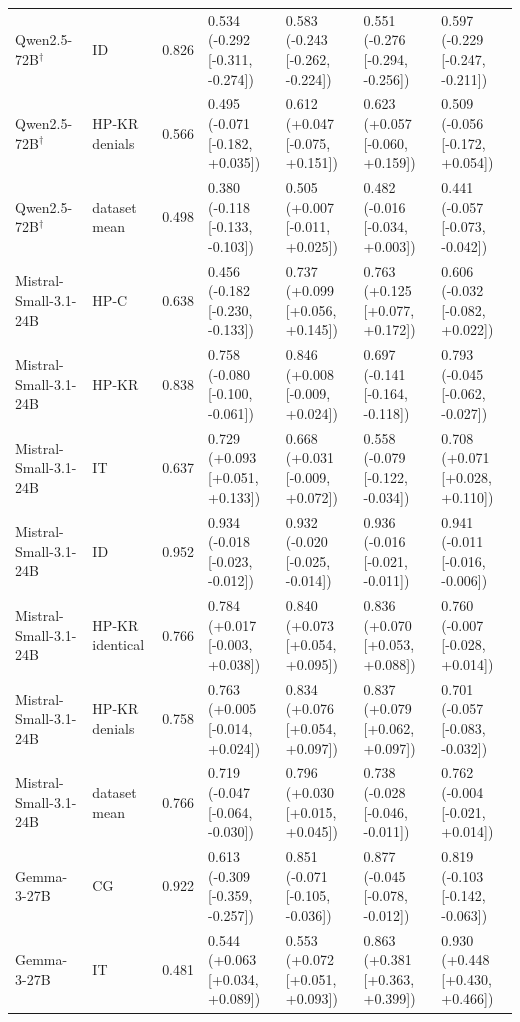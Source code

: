 \begin{table}
{\begin{tabular}{lllllll}
Qwen2.5-72B$^\dagger$ & ID & 0.826 & 0.534 (-0.292 [-0.311, -0.274]) & 0.583 (-0.243 [-0.262, -0.224]) & 0.551 (-0.276 [-0.294, -0.256]) & 0.597 (-0.229 [-0.247, -0.211]) \\
Qwen2.5-72B$^\dagger$ & HP-KR denials & 0.566 & 0.495 (-0.071 [-0.182, +0.035]) & 0.612 (+0.047 [-0.075, +0.151]) & 0.623 (+0.057 [-0.060, +0.159]) & 0.509 (-0.056 [-0.172, +0.054]) \\
Qwen2.5-72B$^\dagger$ & dataset mean & 0.498 & 0.380 (-0.118 [-0.133, -0.103]) & 0.505 (+0.007 [-0.011, +0.025]) & 0.482 (-0.016 [-0.034, +0.003]) & 0.441 (-0.057 [-0.073, -0.042]) \\
Mistral-Small-3.1-24B & HP-C & 0.638 & 0.456 (-0.182 [-0.230, -0.133]) & 0.737 (+0.099 [+0.056, +0.145]) & 0.763 (+0.125 [+0.077, +0.172]) & 0.606 (-0.032 [-0.082, +0.022]) \\
Mistral-Small-3.1-24B & HP-KR & 0.838 & 0.758 (-0.080 [-0.100, -0.061]) & 0.846 (+0.008 [-0.009, +0.024]) & 0.697 (-0.141 [-0.164, -0.118]) & 0.793 (-0.045 [-0.062, -0.027]) \\
Mistral-Small-3.1-24B & IT & 0.637 & 0.729 (+0.093 [+0.051, +0.133]) & 0.668 (+0.031 [-0.009, +0.072]) & 0.558 (-0.079 [-0.122, -0.034]) & 0.708 (+0.071 [+0.028, +0.110]) \\
Mistral-Small-3.1-24B & ID & 0.952 & 0.934 (-0.018 [-0.023, -0.012]) & 0.932 (-0.020 [-0.025, -0.014]) & 0.936 (-0.016 [-0.021, -0.011]) & 0.941 (-0.011 [-0.016, -0.006]) \\
Mistral-Small-3.1-24B & HP-KR identical & 0.766 & 0.784 (+0.017 [-0.003, +0.038]) & 0.840 (+0.073 [+0.054, +0.095]) & 0.836 (+0.070 [+0.053, +0.088]) & 0.760 (-0.007 [-0.028, +0.014]) \\
Mistral-Small-3.1-24B & HP-KR denials & 0.758 & 0.763 (+0.005 [-0.014, +0.024]) & 0.834 (+0.076 [+0.054, +0.097]) & 0.837 (+0.079 [+0.062, +0.097]) & 0.701 (-0.057 [-0.083, -0.032]) \\
Mistral-Small-3.1-24B & dataset mean & 0.766 & 0.719 (-0.047 [-0.064, -0.030]) & 0.796 (+0.030 [+0.015, +0.045]) & 0.738 (-0.028 [-0.046, -0.011]) & 0.762 (-0.004 [-0.021, +0.014]) \\
Gemma-3-27B & CG & 0.922 & 0.613 (-0.309 [-0.359, -0.257]) & 0.851 (-0.071 [-0.105, -0.036]) & 0.877 (-0.045 [-0.078, -0.012]) & 0.819 (-0.103 [-0.142, -0.063]) \\
Gemma-3-27B & IT & 0.481 & 0.544 (+0.063 [+0.034, +0.089]) & 0.553 (+0.072 [+0.051, +0.093]) & 0.863 (+0.381 [+0.363, +0.399]) & 0.930 (+0.448 [+0.430, +0.466]) \\

\end{tabular}}
\end{table}
